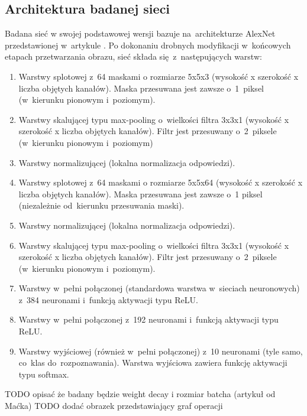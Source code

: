 \subsection{Architektura badanej sieci}
Badana sieć w swojej podstawowej wersji bazuje na~architekturze AlexNet przedstawionej w~artykule \cite{AlexNet}.
Po dokonaniu drobnych modyfikacji w~końcowych etapach przetwarzania obrazu, sieć składa się~z~następujących warstw:
\begin{enumerate}
    \item Warstwy splotowej z~64 maskami o rozmiarze 5x5x3 (wysokość x szerokość x liczba objętych kanałów).
          Maska przesuwana jest zawsze o~1~piksel (w~kierunku pionowym i~poziomym).
    \item Warstwy skalującej typu max-pooling o~wielkości filtra 3x3x1 (wysokość x szerokość x liczba objętych kanałów).
          Filtr jest przesuwany o~2~piksele (w~kierunku pionowym i~poziomym)
    \item Warstwy normalizującej (lokalna normalizacja odpowiedzi).
    \item Warstwy splotowej z~64 maskami o rozmiarze 5x5x64 (wysokość x szerokość x liczba objętych kanałów).
          Maska przesuwana jest zawsze o~1 piksel (niezależnie od~kierunku przesuwania maski).
    \item Warstwy normalizującej (lokalna normalizacja odpowiedzi).
    \item Warstwy skalującej typu max-pooling o~wielkości filtra 3x3x1 (wysokość x szerokość x liczba objętych kanałów).
          Filtr jest przesuwany o~2~piksele (w~kierunku pionowym i~poziomym).
    \item Warstwy w~pełni połączonej (standardowa warstwa w~sieciach neuronowych) z~384 neuronami i~funkcją aktywacji
          typu ReLU.
    \item Warstwy w~pełni połączonej z~192 neuronami i~funkcją aktywacji
          typu ReLU.
    \item Warstwy wyjściowej (również w~pełni połączonej) z~10 neuronami (tyle samo, co~klas do~rozpoznawania).
          Warstwa wyjściowa zawiera funkcję aktywacji typu softmax.
\end{enumerate}

TODO opisać że badany będzie weight decay i rozmiar batcha (artykuł od Maćka)
TODO dodać obrazek przedstawiający graf operacji

